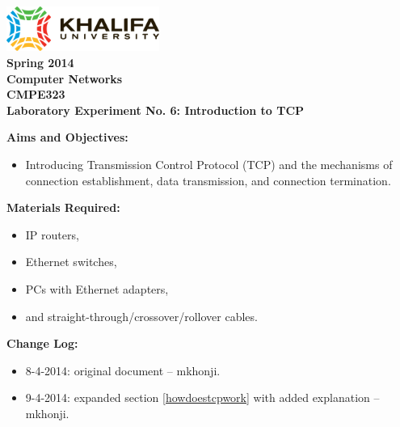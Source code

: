 \documentclass[pdftex,12pt,a4paper]{article}
\begin{document}
    \begin{titlepage}
        \begin{center}
            \includegraphics[width=5cm]{figures/kulogo}\\[1cm]
            {\Large \bfseries
                Spring 2014\\
                Computer Networks\\
                CMPE323\\[1cm]
            }
            {\large \bfseries
                \noindent Laboratory Experiment No. 6: Introduction to TCP\\[1cm]
            }
        \end{center}

        \noindent \textbf{Aims and Objectives:}
            \begin{itemize}[leftmargin=4cm]
                \item Introducing Transmission Control Protocol (TCP) and the
                    mechanisms of connection establishment, data transmission,
                    and connection termination.
            \end{itemize}
            \vspace{0.5cm}

        \noindent \textbf{Materials Required:}
            \begin{itemize}[leftmargin=4cm]
                \item IP routers,
                \item Ethernet switches,
                \item PCs with Ethernet adapters,
                \item and straight-through/crossover/rollover cables.
            \end{itemize}
            \vspace{0.5cm}

        \noindent \textbf{Change Log:}
            \begin{itemize}[leftmargin=4cm]
                \item 8-4-2014: original document -- mkhonji.
                \item 9-4-2014: expanded section \ref{howdoestcpwork} with
                    added explanation --
                    mkhonji.
            \end{itemize}
    \end{titlepage}
    \newpage
\end{document}
